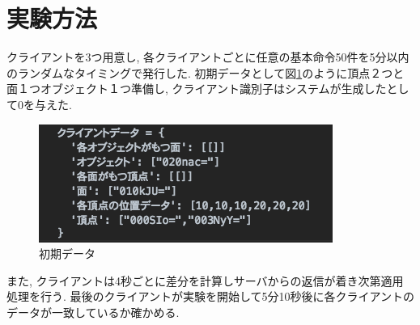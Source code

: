 \section{実験方法}
クライアントを3つ用意し, 各クライアントごとに任意の基本命令50件を5分以内のランダムなタイミングで発行した. 初期データとして図\ref{init}のように頂点２つと面１つオブジェクト１つ準備し, クライアント識別子はシステムが生成したとして0を与えた.
\begin{figure}[htbp]
 \begin{center}
	 \includegraphics[scale=0.7]{images/init}
	 \caption{初期データ}
	 \label{init}
 \end{center}
\end{figure}
また, クライアントは4秒ごとに差分を計算しサーバからの返信が着き次第適用処理を行う. 最後のクライアントが実験を開始して5分10秒後に各クライアントのデータが一致しているか確かめる.
